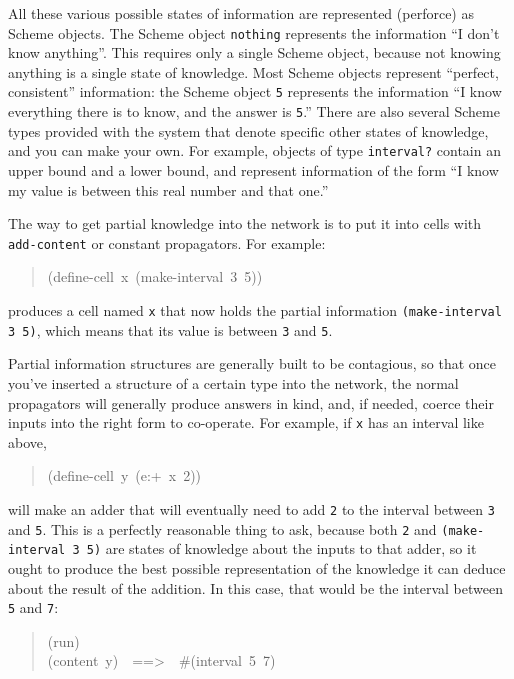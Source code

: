 \documentclass[12pt,letterpaper,english]{article}
\begin{document}
All these various possible states of information are represented
(perforce) as Scheme objects.  The Scheme object \texttt{nothing} represents
the information ``I don't know anything''.  This requires only a single
Scheme object, because not knowing anything is a single state of
knowledge.  Most Scheme objects represent ``perfect, consistent''
information: the Scheme object \texttt{5} represents the information ``I
know everything there is to know, and the answer is \texttt{5}.''  There are
also several Scheme types provided with the system that denote
specific other states of knowledge, and you can make your own.  For
example, objects of type \texttt{interval?} contain an upper bound and a
lower bound, and represent information of the form ``I know my value is
between this real number and that one.''

The way to get partial knowledge into the network is to put it into
cells with \texttt{add-content} or constant propagators.  For example:
\begin{quote}{\ttfamily \raggedright \noindent
(define-cell~x~(make-interval~3~5))
}\end{quote}
produces a cell named \texttt{x} that now holds the partial information
\texttt{(make-interval 3 5)}, which means that its value is
between \texttt{3} and \texttt{5}.

Partial information structures are generally built to be contagious,
so that once you've inserted a structure of a certain type into
the network, the normal propagators will generally produce answers
in kind, and, if needed, coerce their inputs into the right form
to co-operate.  For example, if \texttt{x} has an interval like above,
\begin{quote}{\ttfamily \raggedright \noindent
(define-cell~y~(e:+~x~2))
}\end{quote}
will make an adder that will eventually need to add \texttt{2} to the
interval between \texttt{3} and \texttt{5}.  This is a perfectly reasonable
thing to ask, because both \texttt{2} and \texttt{(make-interval 3 5)} are
states of knowledge about the inputs to that adder, so it ought to
produce the best possible representation of the knowledge it can
deduce about the result of the addition.  In this case, that would be
the interval between \texttt{5} and \texttt{7}:
\begin{quote}{\ttfamily \raggedright \noindent
(run)~\\
(content~y)~~==>~~{\#}(interval~5~7)
}\end{quote}
\end{document}
